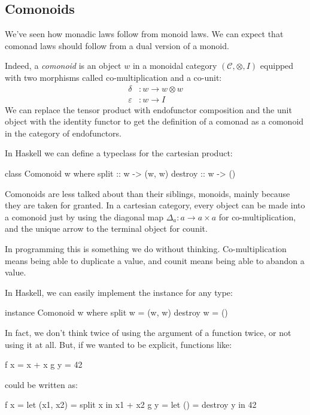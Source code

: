 \documentclass[DaoFP]{subfiles}
\begin{document}
\subsection{Comonoids}

We've seen how monadic laws follow from monoid laws. We can expect that comonad laws should follow from a dual version of a monoid. 

Indeed, a \emph{comonoid} is an object $w$ in a monoidal category $(\mathcal{C}, \otimes, I)$ equipped with two morphisms called co-multiplication and a co-unit:
\begin{align*}
\delta &\colon w \to w \otimes w \\
\varepsilon &\colon w \to I
\end{align*}
We can replace the tensor product with endofunctor composition and the unit object with the identity functor to get the definition of a comonad as a comonoid in the category of endofunctors.

In Haskell we can define a  typeclass for the cartesian product:
\begin{haskell}
class Comonoid w where
  split   :: w -> (w, w)
  destroy :: w -> ()
\end{haskell}

Comonoids are less talked about than their siblings, monoids, mainly because they are taken for granted. In a cartesian category, every object can be made into a comonoid just by using the diagonal map $\Delta_a \colon a \to a \times a$ for co-multiplication, and the unique arrow to the terminal object for counit.

In programming this is something we do without thinking. Co-multiplication means being able to duplicate a value, and counit means being able to abandon a value. 

In Haskell, we can easily implement the  instance for any type:
\begin{haskell}
instance Comonoid w where
  split w   = (w, w)
  destroy w = ()
\end{haskell}
In fact, we don't think twice of using the argument of a function twice, or not using it at all. But, if we wanted to be explicit, functions like:
\begin{haskell}
f x = x + x
g y = 42
\end{haskell}
could be written as:
\begin{haskell}
f x = let (x1, x2) = split x 
      in x1 + x2
g y = let () = destroy y 
      in 42
\end{haskell}
\end{document}
